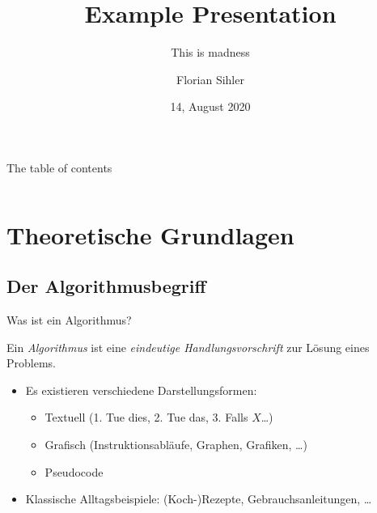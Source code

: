 \documentclass[aspectratio=169,usepdftitle=true,t]{beamer}
\title{Example Presentation}
\subtitle{This is madness}
\institute{Cute-Dispute-Institute \(\circ\) University Ulm}
\date{14, August 2020}
\author{Florian Sihler}
\newcommand\twosplit[3][t]{%
    \begin{columns}[#1]
    \begin{column}{0.475\linewidth}
        #2
    \end{column}\hfill
    \begin{column}{0.475\linewidth}
        #3
    \end{column}
    \end{columns}
}
\begin{document}
\begin{frame}[c]
    \titlepage
\end{frame}

\begin{frame}[c]{The table of contents}
    \begin{center}
        \twosplit{\tableofcontents[sections={1-2}]}
            {\tableofcontents[sections={3-4}]}
    \end{center}
\end{frame}


\section{Theoretische Grundlagen}
\subsection{Der Algorithmusbegriff}
\begin{frame}{Was ist ein Algorithmus?}
    \begin{definition}[Algorithmus]
        Ein \emph{Algorithmus} ist eine \emph{eindeutige Handlungsvorschrift} zur Lösung eines Problems.
    \end{definition}
    \begin{itemize}
        \item Es existieren verschiedene Darstellungsformen: \begin{itemize}
            \item Textuell (1. Tue dies, 2. Tue das, 3. Falls \(X\)\ldots)
            \item Grafisch (Instruktionsabläufe, Graphen, Grafiken, \ldots)
            \item Pseudocode
        \end{itemize}
        \item Klassische Alltagsbeispiele: (Koch-)Rezepte, Gebrauchsanleitungen, \ldots
    \end{itemize}
\end{frame}
\end{document}
